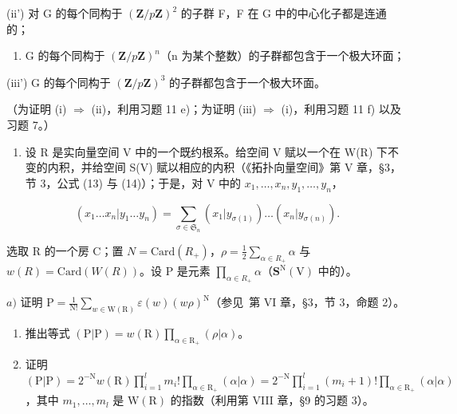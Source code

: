 \begin{enumerate}
(ii') 对 G 的每个同构于 \((\mathbf{Z}/p\mathbf{Z})^{2}\) 的子群 F，F 在 G 中的中心化子都是连通的；

\begin{enumerate}
\def\labelenumi{(\roman{enumi})}
\setcounter{enumi}{2}
\tightlist
\item
  G 的每个同构于 \((\mathbf{Z}/p\mathbf{Z})^{n}\)（n 为某个整数）的子群都包含于一个极大环面；
\end{enumerate}

(iii') G 的每个同构于 \((\mathbf{Z}/p\mathbf{Z})^{3}\) 的子群都包含于一个极大环面。

（为证明 (i) \(\Longrightarrow\) (ii)，利用习题 11 e)；为证明 (iii) \(\Longrightarrow\) (i)，利用习题 11 f) 以及习题 7。）


\begin{enumerate}
\def\labelenumi{\arabic{enumi})}
\tightlist
\item
  设 R 是实向量空间 V 中的一个既约根系。给空间 V 赋以一个在 W(R) 下不变的内积，并给空间 S(V) 赋以相应的内积（《拓扑向量空间》第 V 章，§3，节 3，公式 (13) 与 (14)）；于是，对 V 中的 \(x_{1},\ldots,x_{n},y_{1},\ldots,y_{n}\)，
\end{enumerate}

\[
(x _ {1} \dots x _ {n} | y _ {1} \dots y _ {n}) = \sum_ {\sigma \in \mathfrak {S} _ {n}} (x _ {1} | y _ {\sigma (1)}) \dots (x _ {n} | y _ {\sigma (n)}).
\]

选取 R 的一个房 C；置 \(N = \text{Card}(R_{+})\)，\(\rho = \frac{1}{2} \sum_{\alpha \in R_{+}} \alpha\) 与 \(w(R) = \text{Card}(W(R))\)。设 P 是元素 \(\prod_{\alpha \in R_{+}} \alpha\)（\(\mathbf{S}^{\mathrm{N}}(\mathrm{V})\) 中的）。

\(a)\) 证明 \(\mathrm{P} = \frac{1}{\mathrm{N!}}\sum_{w\in \mathrm{W(R)}}\varepsilon (w)(w\rho)^{\mathrm{N}}\)（参见~第 VI 章，§3，节 3，命题 2）。

\begin{enumerate}
\def\labelenumi{\alph{enumi})}
\setcounter{enumi}{1}
\item
  推出等式 \((\mathrm{P}|\mathrm{P}) = w(\mathrm{R})\prod_{\alpha \in \mathrm{R}_{+}}(\rho |\alpha)\)。
\item
  证明 \((\mathrm{P}|\mathrm{P}) = 2^{-\mathrm{N}}w(\mathrm{R})\prod_{i = 1}^{l}m_i!\prod_{\alpha \in \mathrm{R}_+}(\alpha |\alpha) = 2^{-\mathrm{N}}\prod_{i = 1}^{l}(m_i + 1)!\prod_{\alpha \in \mathrm{R}_+}(\alpha |\alpha)\)，其中 \(m_{1},\ldots ,m_{l}\) 是 \(\mathrm{W(R)}\) 的指数（利用第 VIII 章，§9 的习题 3）。
\end{enumerate}


\end{enumerate}
